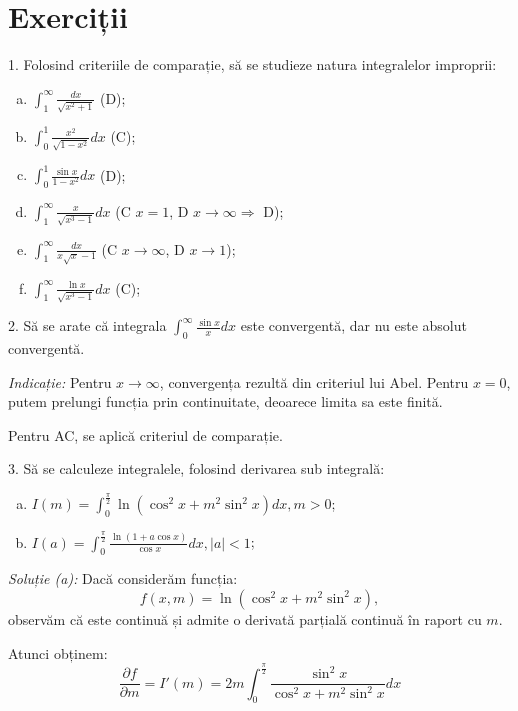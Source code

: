 \documentclass[11pt,a4paper]{article}
\newcommand\ds{\displaystyle}
\theoremstyle{dotless}
\theoremstyle{dotlessdr}
\begin{document}
\section{Exerciții}
\label{sec:exc}

1. Folosind criteriile de comparație, să se studieze natura integralelor improprii:
\begin{enumerate}[(a)]
	\item $\ds\int_1^\infty \frac{dx}{\sqrt{x^2 + 1}}$ \hfill(D);
	\item $\ds\int_0^1 \frac{x^2}{\sqrt{1 - x^2}} dx$ \hfill(C);
	\item $\ds\int_0^1 \frac{\sin x}{1 - x^2} dx$ \hfill(D);
	\item $\ds\int_1^\infty \frac{x}{\sqrt{x^3 - 1}} dx$ \hfill(C $x = 1$, D
	  $x \to \infty \Rightarrow$ D);
	\item $\ds\int_1^\infty \frac{dx}{x \sqrt{x} - 1}$ \hfill (C $x \to \infty$, D $x \to 1$);
	\item $\ds\int_1^\infty \frac{\ln x}{\sqrt{x^3 - 1}} dx$ \hfill(C);
\end{enumerate}

\vspace{1cm}

2. Să se arate că integrala $\ds\int_0^\infty \frac{\sin x}{x} dx$ este convergentă,
dar nu este absolut convergentă.

\emph{Indicație:} Pentru $x \to \infty$, convergența rezultă din criteriul
lui Abel. Pentru $x = 0$, putem prelungi funcția prin continuitate, deoarece
limita sa este finită.

Pentru AC, se aplică criteriul de comparație.

\vspace{1cm}

3. Să se calculeze integralele, folosind derivarea sub integrală:
\begin{enumerate}[(a)]
\item $I(m) = \ds\int_0^{\frac{\pi}{2}} \ln(\cos^2 x + m^2 \sin^2 x) dx, m > 0$;
\item $I(a) = \ds\int_0^{\frac{\pi}{2}} \frac{\ln(1 + a \cos x)}{\cos x} dx, |a| < 1$;
\end{enumerate}

\emph{Soluție (a):} Dacă considerăm funcția:
\[
  f(x, m) = \ln(\cos^2 x + m^2 \sin^2 x),
\]
observăm că este continuă și admite o derivată parțială continuă în raport cu $m$.

Atunci obținem:
\[
  \frac{\partial f}{\partial m} = I'(m) = 2m \int_0^{\frac{\pi}{2}} %
  \frac{\sin^2 x}{\cos^2 x + m^2 \sin^2 x} dx
\]
\end{document}
